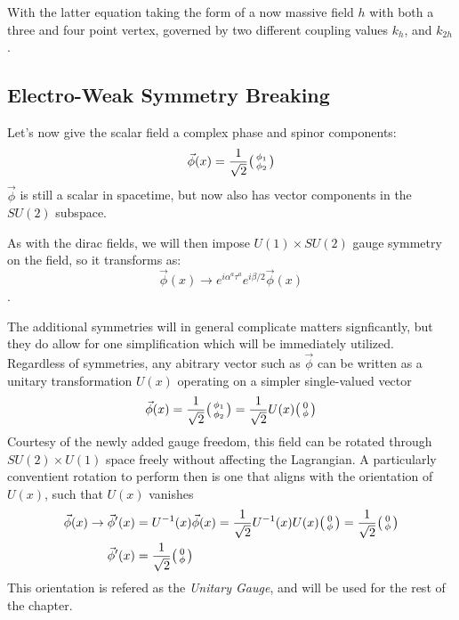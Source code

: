         With the latter equation taking the form of a now massive field $h$ with both a three and four point vertex,
            governed by two different coupling values $k_{h}$, and $k_{2h}$.

        \cite{Halzen_book}

        

    \subsection{Electro-Weak Symmetry Breaking}

        Let's now give the scalar field a complex phase and spinor components:
        \begin{equation}
            \vec{\phi}(x) = \frac{1}{\sqrt{2}} \big(\begin{smallmatrix} \phi_1 \\ \phi_2 \end{smallmatrix}\big)
        \end{equation}
        $\vec{\phi}$ is still a scalar in spacetime, but now also has vector components in the $SU(2)$ subspace.

        As with the dirac fields, we will then impose $U(1) \times SU(2)$ gauge symmetry on the field, so it transforms as:
        \begin{equation}
            \vec{\phi}(x) \rightarrow e^{i \alpha^a \tau^a} e^{i \beta/2 } \vec{\phi}(x)
        \end{equation}.

        The additional symmetries will in general complicate matters signficantly,
            but they do allow for one simplification which will be immediately utilized.
        Regardless of symmetries, any abitrary vector such as $\vec{\phi}$ can be written as a unitary transformation $U(x)$ operating on a simpler single-valued vector
        \begin{equation}
            \vec{\phi}(x) = \frac{1}{\sqrt{2}} \big(\begin{smallmatrix} \phi_1 \\ \phi_2 \end{smallmatrix}\big) = \frac{1}{\sqrt{2}} U(x) \big(\begin{smallmatrix} 0 \\ \phi \end{smallmatrix}\big)
        \end{equation}
        Courtesy of the newly added gauge freedom, this field can be rotated through $SU(2) \times U(1)$ space freely without affecting the Lagrangian.
        A particularly conventient rotation to perform then is one that aligns with the orientation of $U(x)$, such that $U(x)$ vanishes
        \begin{equation} \begin{split}
            \vec{\phi}(x) \rightarrow \vec{\phi}'(x) 
                &= U^{-1}(x) \vec{\phi}(x)
                = \frac{1}{\sqrt{2}} U^{-1}(x) U(x) \big(\begin{smallmatrix} 0 \\ \phi \end{smallmatrix}\big)
                = \frac{1}{\sqrt{2}} \big(\begin{smallmatrix} 0 \\ \phi \end{smallmatrix}\big) \\
            \vec{\phi}'(x) &= \frac{1}{\sqrt{2}} \big(\begin{smallmatrix} 0 \\ \phi \end{smallmatrix}\big)
        \end{split} \end{equation}
        This orientation is refered as the \textit{Unitary Gauge}, and will be used for the rest of the chapter.


